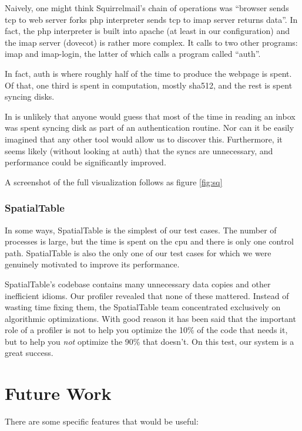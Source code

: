 \documentclass[10pt]{article}
\begin{document}
Naively, one might think Squirrelmail's chain of operations was ``browser sends tcp to web server forks php interpreter sends tcp to imap server returns data''.  In fact, the php interpreter is built into apache (at least in our configuration) and the imap server (dovecot) is rather more complex.  It calls to two other programs: imap and imap-login, the latter of which calls a program called ``auth''.

In fact, auth is where roughly half of the time to produce the webpage is spent.  Of that, one third is spent in computation, mostly sha512, and the rest is spent syncing disks.

In is unlikely that anyone would guess that most of the time in reading an inbox was spent syncing disk as part of an authentication routine.  Nor can it be easily imagined that any other tool would allow us to discover this.  Furthermore, it seems likely (without looking at auth) that the syncs are unnecessary, and performance could be significantly improved.

A screenshot of the full visualization follows as figure \ref{fig:sq}

\subsubsection{SpatialTable}

In some ways, SpatialTable is the simplest of our test cases.  The number of processes is large, but the time is spent on the cpu and there is only one control path.  SpatialTable is also the only one of our test cases for which we were genuinely motivated to improve its performance.

SpatialTable's codebase contains many unnecessary data copies and other inefficient idioms.  Our profiler revealed that none of these mattered.  Instead of wasting time fixing them, the SpatialTable team concentrated exclusively on algorithmic optimizations.  With good reason it has been said that the important role of a profiler is not to help you optimize the 10\% of the code that needs it, but to help you \emph{not} optimize the 90\% that doesn't\cite{taoup}.  On this test, our system is a great success.

\section{Future Work}

There are some specific features that would be useful:
\end{document}
